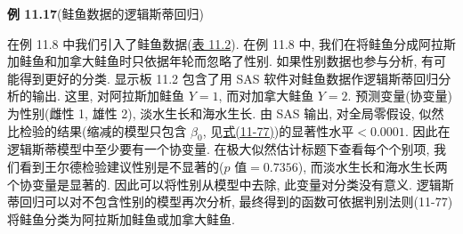 \noindent\textbf{例 11.17}\quad (鲑鱼数据的逻辑斯蒂回归)

在例 11.8 中我们引入了鲑鱼数据(\hyperref[tab:11.2]{表 11.2}). 在例 11.8 中, 我们在将鲑鱼分成阿拉斯加鲑鱼和加拿大鲑鱼时只依据年轮而忽略了性别. 如果性别数据也参与分析, 有可能得到更好的分类. 显示板 11.2 包含了用 SAS 软件对鲑鱼数据作逻辑斯蒂回归分析的输出. 这里, 对阿拉斯加鲑鱼 $Y=1$, 而对加拿大鲑鱼 $Y=2$. 预测变量(协变量)为性别(雌性 1, 雄性 2), 淡水生长和海水生长. 由 SAS 输出, 对全局零假设, 似然比检验的结果(缩减的模型只包含 $\beta_0$, 见\hyperref[eq:11-77]{式(11-77)})的显著性水平$<0.0001$. 因此在逻辑斯蒂模型中至少要有一个协变量. 在极大似然估计标题下查看每个个别项, 我们看到王尔德检验建议性别是不显著的($p$ 值$=0.7356$), 而淡水生长和海水生长两个协变量是显著的. 因此可以将性别从模型中去除, 此变量对分类没有意义. 逻辑斯蒂回归可以对不包含性别的模型再次分析, 最终得到的函数可依据判别法则(11-77)将鲑鱼分类为阿拉斯加鲑鱼或加拿大鲑鱼.
